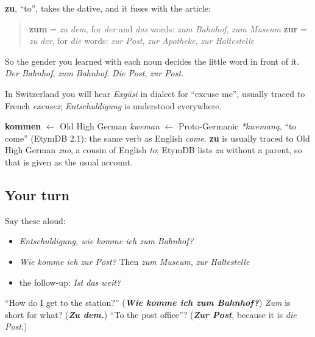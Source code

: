 \begin{grammarlens}[title={Grammar Lens: zum or zur}]
\textbf{zu}, \textquotedblleft{}to\textquotedblright{}, takes the dative, and it fuses with the article:

\begin{quote}
\textbf{zum} = \emph{zu dem}, for \emph{der} and \emph{das} words: \emph{zum Bahnhof}, \emph{zum Museum} \textbf{zur} = \emph{zu der}, for \emph{die} words: \emph{zur Post}, \emph{zur Apotheke}, \emph{zur Haltestelle}
\end{quote}

So the gender you learned with each noun decides the little word in front of it. \emph{Der Bahnhof}, \emph{zum Bahnhof}. \emph{Die Post}, \emph{zur Post}.

In Switzerland you will hear \emph{Exgüsi} in dialect for \textquotedblleft{}excuse me\textquotedblright{}, usually traced to French \emph{excusez}; \emph{Entschuldigung} is understood everywhere.
\end{grammarlens}

\begin{cousinweb}
\textbf{kommen} $\leftarrow$ Old High German \emph{kweman} $\leftarrow$ Proto-Germanic \emph{*kwemaną}, \textquotedblleft{}to come\textquotedblright{} (EtymDB 2.1): the same verb as English \emph{come}. \textbf{zu} is usually traced to Old High German \emph{zuo}, a cousin of English \emph{to}; EtymDB lists \emph{zu} without a parent, so that is given as the usual account.
\end{cousinweb}

\subsection*{Your turn}
Say these aloud:

\begin{itemize}
\raggedright
  \item \emph{Entschuldigung, wie komme ich zum Bahnhof?}
  \item \emph{Wie komme ich zur Post?} Then \emph{zum Museum}, \emph{zur Haltestelle}
  \item the follow-up: \emph{Ist das weit?}
\end{itemize}

\begin{tcolorbox}[breakable,colback=teal!4,colframe=teal!35!black,title={Before you move on}]
\textquotedblleft{}How do I get to the station?\textquotedblright{} (\emph{\textbf{Wie komme ich zum Bahnhof?}}) \emph{Zum} is short for what? (\emph{\textbf{Zu dem.}}) \textquotedblleft{}To the post office\textquotedblright{}? (\emph{\textbf{Zur Post}}, because it is \emph{die Post}.)
\end{tcolorbox}
